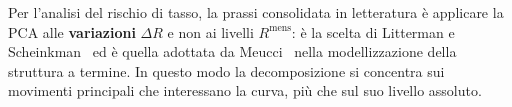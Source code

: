 \documentclass[11pt,a4paper]{article}
\theoremstyle{plain}
\theoremstyle{definition}
\theoremstyle{remark}
\begin{document}
%
%


Per l'analisi del rischio di tasso, la prassi consolidata in letteratura è
applicare la PCA alle \textbf{variazioni} $\Delta R$ e non ai livelli
$R^{\text{mens}}$: è la scelta di Litterman e
Scheinkman~\cite{litterman1991} ed è quella adottata da
Meucci~\cite{meucci2009} nella modellizzazione della struttura a termine. In
questo modo la decomposizione si concentra sui movimenti principali che
interessano la curva, più che sul suo livello assoluto.
\end{document}
